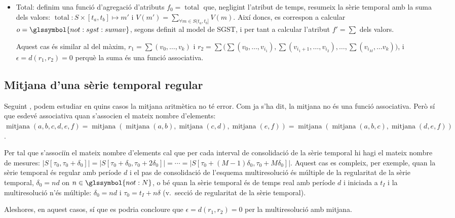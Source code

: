 \begin{itemize}
  \item Total: definim una funció d'agregació d'atributs
    $f_0=\operatorname{total}$ que, negligint l'atribut de temps,
    resumeix la sèrie temporal amb la suma dels valors:
    $\operatorname{total}: S \times [t_a,t_b] \mapsto m'$ i $V(m') =
    \sum\limits_{\forall m\in S(t_a,t_b]} V(m)$. Així doncs, es
    correspon a calcular $o=\glssymbol{not:sgst:sumav}$, segons
    definit al model de \gls{SGST}, i per tant a calcular l'atribut
    $f'=\sum$ dels valors.

    Aquest cas és similar al del màxim, $r_1=\sum(v_0,\dotsc, v_k)$ i
    $r_2=\sum\big( \sum(v_0,\dotsc,v_{i_1}),
    \sum(v_{i_1+1},\dotsc,v_{i_2}), \dotsc, \sum(v_{i_M}, \dotsc v_k)
    \big)$, i $\epsilon=d(r_1,r_2)=0$ perquè la suma és una funció
    associativa.
    



  \end{itemize}


\subsection{Mitjana d'una sèrie temporal regular}

  Seguint , podem estudiar en quins
  casos la mitjana aritmètica no té error. Com ja s'ha dit, la mitjana
  no és una funció associativa. Però sí que esdevé associativa quan
  s'associen el mateix nombre d'elements:
  $\operatorname{mitjana}(a,b,c,d,e,f) = \operatorname{mitjana}(
  \operatorname{mitjana}(a,b), \operatorname{mitjana}(c,d),
  \operatorname{mitjana}(e,f)) = \operatorname{mitjana}(
  \operatorname{mitjana}(a,b,c), \operatorname{mitjana}(d,e,f))$.

  Per tal que s'associïn el mateix nombre d'elements cal que per cada
  interval de consolidació de la sèrie temporal hi hagi el mateix
  nombre de mesures:
  $|S[\tau_0,\tau_0+\delta_0]|=|S[\tau_0+\delta_0,\tau_0+2\delta_0]|=\dotsb
  = |S[\tau_0+(M-1)\delta_0,\tau_0+M\delta_0]|$.  Aquest cas es
  compleix, per exemple, quan la sèrie temporal és regular amb període
  $d$ i el pas de consolidació de l'esquema multiresolució és múltiple
  de la regularitat de la sèrie temporal, $\delta_0 = nd$ on
  $n\in\glssymbol{not:N}$, o bé quan la sèrie temporal és de temps
  real amb període $d$ i iniciada a $t_I$ i la multiresolució n'és
  múltiple: $\delta_0 = nd$ i $\tau_0 = t_I+n\delta$ (v.\ secció de
  regularitat de la sèrie temporal).

  Aleshores, en aquest casos, sí que es podria concloure que
  $\epsilon=d(r_1,r_2)=0$ per la multiresolució amb mitjana.



